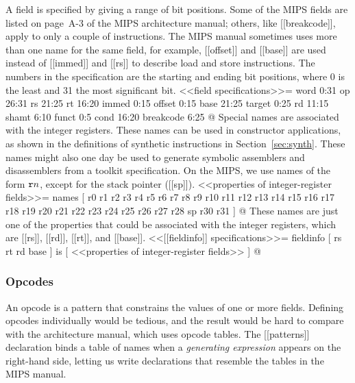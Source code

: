 A field is specified by giving a range of bit positions. 
Some of the MIPS fields are listed on page~A-3 of the MIPS
architecture manual; others, like [[breakcode]], apply to only 
a couple of instructions.
The MIPS manual sometimes uses more than one name for the same field, for
example, [[offset]] and [[base]] are used instead  of [[immed]] and [[rs]] to
describe load and store instructions.
The numbers in the specification
are the starting and ending bit positions,
where 0 is the least and 31 the most significant bit.
<<field specifications>>=
word 0:31 op 26:31 rs 21:25 rt 16:20 immed 0:15 offset 0:15 base 21:25 
target 0:25 rd 11:15 shamt 6:10 funct 0:5 cond 16:20 breakcode 6:25
@
Special names are associated with the integer registers.
These names can be used in constructor applications, as shown 
in the definitions of synthetic instructions in
Section~\ref{sec:synth}.
These names might also one day be used to generate symbolic assemblers and
disassemblers from a toolkit specification.
On the MIPS, we use names of the form $\hbox{\tt r}n$, except for the
stack pointer ([[sp]]).
<<properties of integer-register fields>>=
names [ r0  r1  r2  r3  r4  r5  r6  r7  r8  r9  r10 r11 r12 r13 r14 r15
        r16 r17 r18 r19 r20 r21 r22 r23 r24 r25 r26 r27 r28 sp  r30 r31 ]
@ These names are just one of the properties that could be associated
with the integer registers, which are [[rs]], [[rd]], [[rt]], and [[base]].
<<[[fieldinfo]] specifications>>=
fieldinfo [ rs rt rd base ] is [ <<properties of integer-register fields>> ]
@
\subsubsection{Opcodes}
An opcode is a pattern that constrains the values of 
one or more fields.
Defining opcodes individually would be tedious, and the result would
be hard to compare with the architecture manual, which uses
opcode tables.
The [[patterns]] declaration binds a table of names when
a {\em generating expression} appears on the right-hand side, letting
us write declarations that resemble the tables in the MIPS manual.
 
